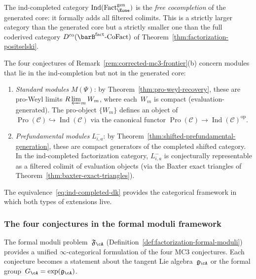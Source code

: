 \begin{remark}
\label{rem:ind-vs-proweyl}
The ind-completed category
$\operatorname{Ind}(\operatorname{Fact}_{\Eone}^{\mathrm{gen}})$
is the \emph{free cocompletion} of the generated core: it
formally adds all filtered colimits. This is a strictly larger
category than the generated core but a strictly smaller one than
the full coderived category
$D^{\mathrm{co}}(\barB^{\mathrm{fact}}\text{-}\mathrm{CoFact})$
of Theorem~\ref{thm:factorization-positselski}.

The four conjectures of
Remark~\ref{rem:corrected-mc3-frontier}(b) concern modules
that lie in the ind-completion but not in the generated core:
\begin{enumerate}[label=\textup{(\alph*)}]
\item \emph{Standard modules} $M(\Psi)$: by
 Theorem~\ref{thm:pro-weyl-recovery}, these are
 pro-Weyl limits $R\varprojlim_m W_m$, where each~$W_m$ is
 compact (evaluation-generated). The pro-object
 $\{W_m\}$ defines an object of $\operatorname{Pro}(\mathcal{C})
 \hookrightarrow \operatorname{Ind}(\mathcal{C})$
 via the canonical functor
 $\operatorname{Pro}(\mathcal{C}) \to
 \operatorname{Ind}(\mathcal{C})^{\mathrm{op}}$.
\item \emph{Prefundamental modules} $L^-_{i,a}$: by
 Theorem~\ref{thm:shifted-prefundamental-generation}, these
 are compact generators of the completed shifted category.
 In the ind-completed factorization category, $L^-_{i,a}$
 is conjecturally representable as a filtered colimit of evaluation
 objects (via the Baxter exact triangles of
 Theorem~\ref{thm:baxter-exact-triangles}).
\end{enumerate}
The equivalence~\eqref{eq:ind-completed-dk} provides the
categorical framework in which both types of extensions live.
\end{remark}

\subsubsection*{The four conjectures in the formal moduli framework}

The formal moduli problem~$\mathfrak{F}_{\cA}$
(Definition~\ref{def:factorization-formal-moduli}) provides a
unified $\infty$-categorical formulation of the four MC3
conjectures. Each conjecture becomes a statement about the
tangent Lie algebra~$\mathfrak{g}_{\cA}$ or the formal
group~$G_{\cA} = \exp(\mathfrak{g}_{\cA})$.

